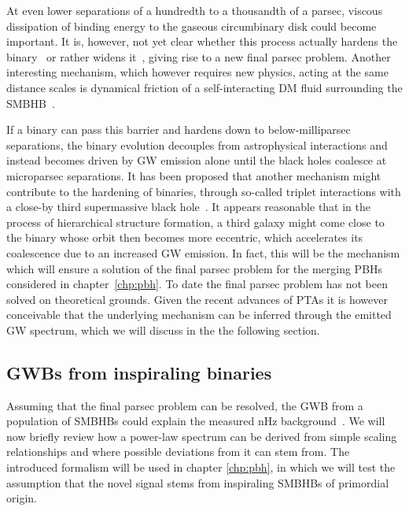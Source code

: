 At even lower separations of a hundredth to a thousandth of a parsec, viscous dissipation of binding energy  to the gaseous circumbinary disk could become important. It is, however, not yet clear whether this process actually hardens the binary~\cite{Ivanov:1998qk, Haiman:2009te} or rather widens it~\cite{Kocsis:2010xa}, giving rise to a new final parsec problem. Another interesting mechanism, which however requires new physics, acting at the same distance scales is dynamical friction of a self-interacting \ac{DM} fluid surrounding the \ac{SMBHB}~\cite{Alonso-Alvarez:2024gdz}. 

If a binary can pass this barrier and hardens down to below-milliparsec separations, the binary evolution decouples from astrophysical interactions and instead becomes driven by \ac{GW} emission alone until the black holes coalesce at microparsec separations.  It has been proposed that another mechanism might contribute to the hardening of binaries, through so-called triplet interactions with a close-by third supermassive black hole~\cite{Amaro-Seoane:2009ucl}. It appears reasonable that in the process of hierarchical structure formation, a third galaxy might come close to the binary whose orbit then becomes more eccentric, which accelerates its coalescence due to an increased \ac{GW} emission. In fact, this will be the mechanism which will ensure a solution of the final parsec problem for the merging \acp{PBH} considered in chapter~\ref{chp:pbh}. To date the final parsec problem has not been solved on theoretical grounds. Given the recent advances of \acp{PTA} it is however conceivable that the underlying mechanism can  be inferred through the emitted \ac{GW} spectrum, which we will discuss in the the following section.

\subsection{GWBs from inspiraling binaries}

Assuming that the final parsec problem can be resolved, the \ac{GWB} from a population of \acp{SMBHB} could explain the measured nHz background~\cite{NANOGrav:2023hfp}. We will now briefly review how a power-law spectrum can be derived from simple scaling  relationships and where possible deviations from it can stem from. The introduced formalism will be used in chapter \ref{chp:pbh}, in which we will test the assumption that the novel signal stems from inspiraling \acp{SMBHB} of primordial origin.

